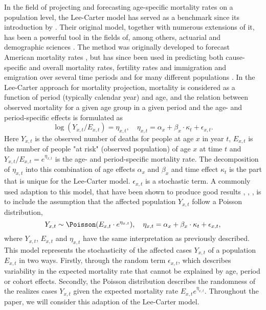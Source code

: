 In the field of projecting and forecasting age-specific mortality rates on a population level, the Lee-Carter model has served as a benchmark since its introduction by \textcite{LeeCarter1992}. Their original model, together with numerous extensions of it, has been a powerful tool in the fields of, among others, actuarial and demographic sciences \parencite{booth_tickle_2008}. The method was originally developed to forecast American mortality rates \parencite{LeeCarter1992}, but has since been used in predicting both cause-specific and overall mortality rates, fertility rates and immigration and emigration over several time periods and for many different populations \parencite{GirosiKing2007}. 
\newline
\noindent In the Lee-Carter approach for mortality projection, mortality is considered as a function of period (typically calendar year) and age, and the relation between observed mortality for a given age group in a given period and the age- and period-specific effects is formulated as 
\begin{equation}
\log(Y_{x,t}/E_{x,t})  = \eta_{x,t}, \quad \eta_{x,t}= \alpha_x + \beta_x\cdot\kappa_t + \epsilon_{x,t}.
\label{eq:orig-LC-model}
\end{equation}
Here $Y_{x,t}$ is the observed number of deaths for people at age $x$ in year $t$, $E_{x,t}$ is the number of people "at risk" (observed population) of age $x$ at time $t$ and $Y_{x,t}/E_{x,t} = e^{\eta_{x,t}}$ is the age- and period-specific mortality rate. The decomposition of $\eta_{x,t}$ into this combination of age effects $\alpha_x$ and $\beta_x$ and time effect $\kappa_t$ is the part that is unique for the Lee-Carter model. $\epsilon_{x,t}$ is a stochastic term.
\newpar A commonly used adaption to this model, that have been shown to produce good results \parencite{CZADO2005260}, \parencite{Wisniowski2015}, \parencite{BROUHNS2002373}, is to include the assumption that the affected population $Y_{x,t}$ follow a Poisson distribution,
\begin{equation}
Y_{x,t} \sim \Poisson(E_{x,t}\cdot e^{\eta_{x,t}}), \quad \eta_{x,t}= \alpha_x + \beta_x\cdot\kappa_t + \epsilon_{x,t},
\label{eq:LC-model}
\end{equation}
where $Y_{x,t}$, $E_{x,t}$ and $\eta_{x,t}$ have the same interpretation as previously described. This model represents the stochasticity of the affected cases $Y_{x,t}$ of a population $E_{x,t}$ in two ways. Firstly, through the random term $\epsilon_{x,t}$, which describes variability in the expected mortality rate that cannot be explained by age, period or cohort effects. Secondly, the Poisson distribution describes the randomness of the realizes cases $Y_{x,t}$ given the expected mortality rate $E_{x,t}e^{\eta_{x,t}}$. Throughout the paper, we will consider this adaption of the Lee-Carter model. 
